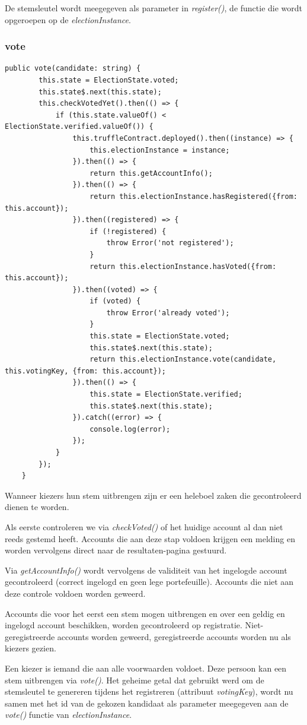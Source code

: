 		De stemsleutel wordt meegegeven als parameter in \textit{register()}, de functie die wordt opgeroepen op de \textit{electionInstance}.
	\subsubsection{vote}
	\lstset{language=JavaScriptSolidity} 
	\begin{lstlisting}[numbers=none]
	public vote(candidate: string) {
		this.state = ElectionState.voted;
		this.state$.next(this.state);
		this.checkVotedYet().then(() => {
			if (this.state.valueOf() < ElectionState.verified.valueOf()) {
				this.truffleContract.deployed().then((instance) => {
					this.electionInstance = instance;
				}).then(() => {
					return this.getAccountInfo();
				}).then(() => {
					return this.electionInstance.hasRegistered({from: this.account});
				}).then((registered) => {
					if (!registered) {
						throw Error('not registered');
					}
					return this.electionInstance.hasVoted({from: this.account});
				}).then((voted) => {
					if (voted) {
						throw Error('already voted');
					}
					this.state = ElectionState.voted;
					this.state$.next(this.state);
					return this.electionInstance.vote(candidate, this.votingKey, {from: this.account});
				}).then(() => {
					this.state = ElectionState.verified;
					this.state$.next(this.state);
				}).catch((error) => {
					console.log(error);
				});
			}
		});
	}
	\end{lstlisting}
	Wanneer kiezers hun stem uitbrengen zijn er een heleboel zaken die gecontroleerd dienen te worden. 
	
	Als eerste controleren we via \textit{checkVoted()} of het huidige account al dan niet reeds gestemd heeft. Accounts die aan deze stap voldoen krijgen een melding en worden vervolgens direct naar de resultaten-pagina gestuurd.
	
	Via \textit{getAccountInfo()} wordt vervolgens de validiteit van het ingelogde account gecontroleerd (correct ingelogd en geen lege portefeuille). Accounts die niet aan deze controle voldoen worden geweerd. 
	
	Accounts die voor het eerst een stem mogen uitbrengen en over een geldig en ingelogd account beschikken, worden gecontroleerd op registratie. Niet-geregistreerde accounts worden geweerd, geregistreerde accounts worden nu als kiezers gezien.
	
	Een kiezer is iemand die aan alle voorwaarden voldoet. Deze persoon kan een stem uitbrengen via \textit{vote()}. Het geheime getal dat gebruikt werd om de stemsleutel te genereren tijdens het registreren (attribuut \textit{votingKey}), wordt nu samen met het id van de gekozen kandidaat als parameter meegegeven aan de \textit{vote()} functie van \textit{electionInstance}.
